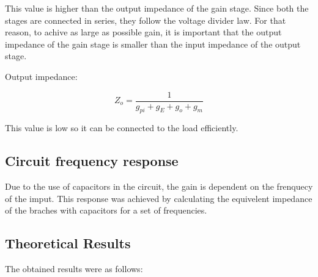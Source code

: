 This value is higher than the output impedance of the gain stage. Since both the stages are connected in series, they follow the voltage divider law. For that reason, to achive as large as possible gain, it is important that the output impedance of the gain stage is smaller than the input impedance of the output stage.

Output impedance:

\[
Z_o = \frac{1}{g_{pi}+g_E+g_o+g_m}
\]

This value is low so it can be connected to the load efficiently.

\subsection {Circuit frequency response}
Due to the use of capacitors in the circuit, the gain is dependent on the frenquecy of the imput. This response was achieved by calculating the equivelent impedance of the braches with capacitors for a set of frequencies.



\subsection{Theoretical Results}
\label{subsec:res_the}

The obtained results were as follows:

%   		
%	
%   

%   		
%	


